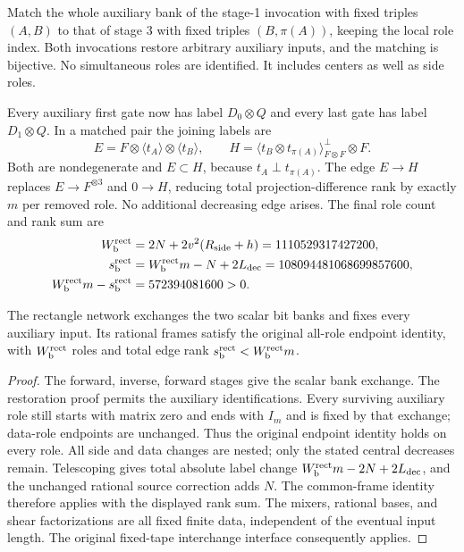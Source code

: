 Match the whole auxiliary bank of the stage-1 invocation with fixed triples
$(A,B)$ to that of stage 3 with fixed triples $(B,\pi(A))$, keeping the local
role index. Both invocations restore arbitrary auxiliary inputs, and the
matching is bijective. No simultaneous roles are identified. It includes
centers as well as side roles.

Every auxiliary first gate now has label $D_0\otimes Q$ and every last gate
has label $D_1\otimes Q$. In a matched pair the joining labels are
\[
 E=F\otimes\langle t_A\rangle\otimes\langle t_B\rangle,
 \qquad
 H=\langle t_B\otimes t_{\pi(A)}\rangle^\perp_{F\otimes F}\otimes F.
\]
Both are nondegenerate and $E\subset H$, because $t_A\perp t_{\pi(A)}$.
The edge $E\to H$ replaces $E\to F^{\otimes3}$ and $0\to H$,
reducing total projection-difference rank by exactly $m$ per removed role.
No additional decreasing edge arises. The final role count and rank sum are
\begin{align*}
 W_{\rm b}^{\rm rect}&=2N+2v^2(R_{\rm side}+h)=1110529317427200,\\
 s_{\rm b}^{\rm rect}&=W_{\rm b}^{\rm rect}m-N+2L_{\rm dec}
                         =108094481068699857600,\\
 W_{\rm b}^{\rm rect}m-s_{\rm b}^{\rm rect}&=572394081600>0.
\end{align*}

\begin{proposition}\label{prop:incidence-bit-interface}
The rectangle network exchanges the two scalar bit banks and fixes every
auxiliary input. Its rational frames satisfy the original all-role endpoint
identity, with $W_{\rm b}^{\rm rect}$ roles and total edge rank
$s_{\rm b}^{\rm rect}<W_{\rm b}^{\rm rect}m$.
\end{proposition}
\begin{proof}
The forward, inverse, forward stages give the scalar bank exchange. The
restoration proof permits the auxiliary identifications. Every surviving
auxiliary role still starts with matrix zero and ends with $I_m$ and is fixed
by that exchange; data-role endpoints are unchanged. Thus the original
endpoint identity holds on every role. All side and data changes are nested;
only the stated central decreases remain. Telescoping gives total absolute
label change $W_{\rm b}^{\rm rect}m-2N+2L_{\rm dec}$, and the unchanged
rational source correction adds $N$. The common-frame identity therefore
applies with the displayed rank sum. The mixers, rational bases, and shear
factorizations are all fixed finite data, independent of the eventual input
length. The original fixed-tape interchange interface consequently applies.
\end{proof}

